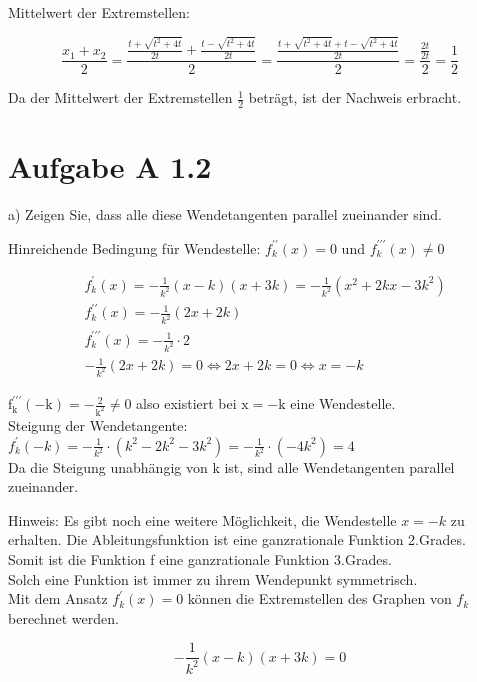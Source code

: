 \documentclass[10pt]{article}
\begin{document}
Mittelwert der Extremstellen:

$$
\frac{x_{1}+x_{2}}{2}=\frac{\frac{t+\sqrt{t^{2}+4 t}}{2 t}+\frac{t-\sqrt{t^{2}+4 t}}{2 t}}{2}=\frac{\frac{t+\sqrt{t^{2}+4 t}+t-\sqrt{t^{2}+4 t}}{2 t}}{2}=\frac{\frac{2 t}{2 t}}{2}=\frac{1}{2}
$$

Da der Mittelwert der Extremstellen $\frac{1}{2}$ beträgt, ist der Nachweis erbracht.

\section*{Aufgabe A 1.2}
a) Zeigen Sie, dass alle diese Wendetangenten parallel zueinander sind.

Hinreichende Bedingung für Wendestelle: $f_{k}^{\prime \prime}(x)=0$ und $f_{k}^{\prime \prime \prime}(x) \neq 0$

$$
\begin{aligned}
& f_{k}^{\prime}(x)=-\frac{1}{k^{2}}(x-k)(x+3 k)=-\frac{1}{k^{2}}\left(x^{2}+2 k x-3 k^{2}\right) \\
& f_{k}^{\prime \prime}(x)=-\frac{1}{k^{2}}(2 x+2 k) \\
& f_{k}^{\prime \prime \prime}(x)=-\frac{1}{k^{2}} \cdot 2 \\
& -\frac{1}{k^{2}}(2 x+2 k)=0 \Leftrightarrow 2 x+2 k=0 \Leftrightarrow x=-k
\end{aligned}
$$

$\mathrm{f}_{\mathrm{k}}^{\prime \prime \prime}(-\mathrm{k})=-\frac{2}{\mathrm{k}^{2}} \neq 0$ also existiert bei $\mathrm{x}=-\mathrm{k}$ eine Wendestelle.\\
Steigung der Wendetangente: $f_{k}^{\prime}(-k)=-\frac{1}{k^{2}} \cdot\left(k^{2}-2 k^{2}-3 k^{2}\right)=-\frac{1}{k^{2}} \cdot\left(-4 k^{2}\right)=4$\\
Da die Steigung unabhängig von k ist, sind alle Wendetangenten parallel zueinander.

Hinweis:
Es gibt noch eine weitere Möglichkeit, die Wendestelle $x=-k$ zu erhalten. Die Ableitungsfunktion ist eine ganzrationale Funktion 2.Grades.\\
Somit ist die Funktion f eine ganzrationale Funktion 3.Grades.\\
Solch eine Funktion ist immer zu ihrem Wendepunkt symmetrisch.\\
Mit dem Ansatz $f_{k}^{\prime}(x)=0$ können die Extremstellen des Graphen von $f_{k}$ berechnet werden.

$$
-\frac{1}{k^{2}}(x-k)(x+3 k)=0
$$
\end{document}
